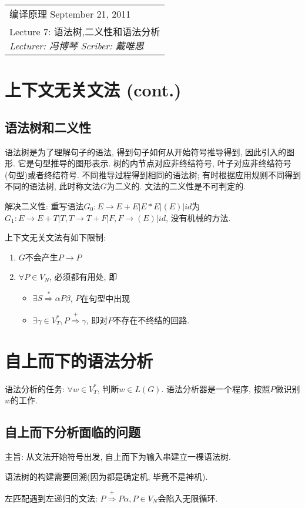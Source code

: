 \def\lecture{7}
\clearpage \noindent\begin{tabularx}{\linewidth}{|X|}
\hline \vskip -2mm
{\sf 编译原理} \hfill September 21, 2011 \\
{\centering \sf \large Lecture \lecture:
语法树,二义性和语法分析 \\ }
\textsl{Lecturer: 冯博琴 \hfill Scriber: 戴唯思}\\ \hline
\end{tabularx}
\setcounter{section}{0}
\renewcommand{\thepage}{\lecture -\arabic{page}}

\section{上下文无关文法 (cont.)}

    \subsection{语法树和二义性}

        \textsf{语法树}是为了理解句子的语法, 得到句子如何从开始符号推导得到, 因此引入的图形. 它是句型推导的图形表示. 树的内节点对应非终结符号, 叶子对应非终结符号(句型)或者终结符号. 不同推导过程得到相同的语法树; 有时根据应用规则不同得到不同的语法树, 此时称文法$G$为\textsf{二义的}. 文法的二义性是不可判定的.

        解决二义性: 重写语法$G_0:E\to E+E|E*E|(E)|id$为$G_1:E\to E+T|T, T\to T+F|F, F\to(E)|id$, 没有机械的方法.

        上下文无关文法有如下限制:

        \begin{enumerate}
            \item $G$不会产生$P\to P$
            \item $\forall P\in V_N$, 必须都有用处, 即
                \begin{itemize}
                    \item $\exists S\stackrel{*}{\Rightarrow} \alpha P\beta$, $P$在句型中出现
                    \item $\exists \gamma\in V_T^*, P\stackrel{+}{\Rightarrow}\gamma$, 即对$P$不存在不终结的回路.
                \end{itemize}
        \end{enumerate}

\section{自上而下的语法分析}

    语法分析的任务: $\forall w\in V_T^*$, 判断$w\in L(G)$. 语法分析器是一个程序, 按照$P$做识别$w$的工作.

    \subsection{自上而下分析面临的问题}

        主旨: 从文法开始符号出发, 自上而下为输入串建立一棵语法树. 

        语法树的构建需要回溯(因为都是确定机, 毕竟不是神机).

        左匹配遇到\textsf{左递归}的文法: $P\stackrel{+}{\Rightarrow}P\alpha, P\in V_N$会陷入无限循环.
